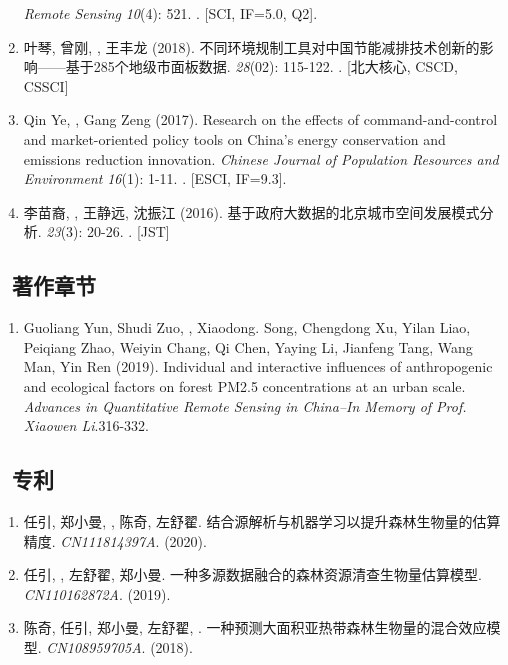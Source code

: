 \begin{enumerate}
    \textit{Remote Sensing} \textit{10}(4): 521.
    . [SCI, IF=5.0, Q2].
\item
    叶琴, 曾刚, {}, 王丰龙 (2018).
	不同环境规制工具对中国节能减排技术创新的影响——基于285个地级市面板数据.
    {} \textit{28}(02): 115-122.
    . [北大核心, CSCD, CSSCI]
\item
    Qin Ye, \Shaoqing, Gang Zeng (2017).
	Research on the effects of command-and-control and market-oriented policy tools on China’s energy conservation and emissions reduction innovation.
    \textit{Chinese Journal of Population Resources and Environment} \textit{16}(1): 1-11.
    . [ESCI, IF=9.3].
\item
   李苗裔, {}, 王静远, 沈振江 (2016).
	基于政府大数据的北京城市空间发展模式分析.
    {} \textit{23}(3): 20-26.
    . [JST]
\end{enumerate}

\subsection*{\texorpdfstring{\faBook\ 著作章节}{著作章节}}
\begin{enumerate}
\item
    Guoliang Yun, Shudi Zuo, \Shaoqing, Xiaodong. Song, Chengdong Xu, Yilan Liao, Peiqiang Zhao, Weiyin Chang, Qi Chen, Yaying Li, Jianfeng Tang, Wang Man, Yin Ren (2019).
	Individual and interactive influences of anthropogenic and ecological factors on forest PM2.5 concentrations at an urban scale.
    \textit{Advances in Quantitative Remote Sensing in China–In Memory of Prof. Xiaowen Li}.316-332.
\end{enumerate}

\subsection*{\texorpdfstring{\faBook\ 专利}{专利}}
\begin{enumerate}
\item
     任引, 郑小曼, {}, 陈奇, 左舒翟.
     结合源解析与机器学习以提升森林生物量的估算精度.
     \textit{CN111814397A}. (2020).
\item
     任引, {}, 左舒翟, 郑小曼.
     一种多源数据融合的森林资源清查生物量估算模型.
     \textit{CN110162872A}. (2019).
\item
     陈奇, 任引, 郑小曼, 左舒翟, {}.
     一种预测大面积亚热带森林生物量的混合效应模型.
     \textit{CN108959705A}. (2018).
\end{enumerate}

